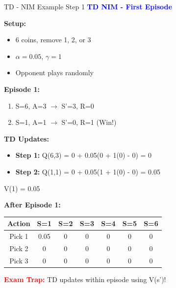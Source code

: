\documentclass[8pt]{beamer}
\begin{document}
	\begin{frame}{TD - NIM Example Step 1}
		\fontsize{6.5}{7.5}\selectfont
		\textcolor{blue}{\textbf{TD NIM - First Episode}}
		
		\textbf{Setup:}
		\begin{itemize}
			\item 6 coins, remove 1, 2, or 3
			\item $\alpha = 0.05$, $\gamma = 1$
			\item Opponent plays randomly
		\end{itemize}
		
		\textbf{Episode 1:}
		\begin{enumerate}
			\item S=6, A=3 $\rightarrow$ S'=3, R=0
			\item S=1, A=1 $\rightarrow$ S'=0, R=1 (Win!)
		\end{enumerate}
		
		\textbf{TD Updates:}
		\begin{itemize}
			\item \textbf{Step 1:} Q(6,3) = 0 + 0.05(0 + 1(0) - 0) = 0
			\item \textbf{Step 2:} Q(1,1) = 0 + 0.05(1 + 1(0) - 0) = 0.05
		\end{itemize}
		V(1) = 0.05
		
		\textbf{After Episode 1:}
		\begin{tabular}{|c|c|c|c|c|c|c|}
			\hline
			Action & S=1 & S=2 & S=3 & S=4 & S=5 & S=6 \\
			\hline
			Pick 1 & 0.05 & 0 & 0 & 0 & 0 & 0 \\
			\hline
			Pick 2 & 0 & 0 & 0 & 0 & 0 & 0 \\
			\hline
			Pick 3 & 0 & 0 & 0 & 0 & 0 & 0 \\
			\hline
		\end{tabular}
		
		\textcolor{red}{\textbf{Exam Trap:}} TD updates within episode using V(s')!
	\end{frame}
	
\end{document}
